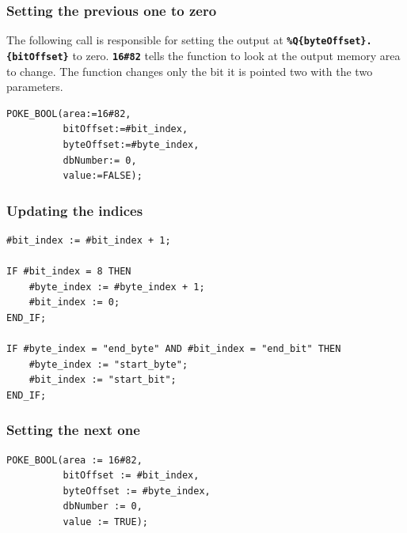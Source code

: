 \documentclass[a4paper, 12pt, titlepage]{article}
\begin{document}
            \subsubsection{Setting the previous one to zero}
                The following call is responsible for setting the output at 
                \textbf{\texttt{\%Q\{byteOffset\}.\{bitOffset\}}} to zero. 
                \texttt{\textbf{16\#82}} tells the function to look at the output memory
                area to change. The function changes only the bit it is pointed two with the
                two parameters.
\begin{lstlisting} 
POKE_BOOL(area:=16#82,
          bitOffset:=#bit_index,
          byteOffset:=#byte_index,
          dbNumber:= 0,
          value:=FALSE);
\end{lstlisting}
            \subsubsection{Updating the indices}
\begin{lstlisting}
#bit_index := #bit_index + 1;

IF #bit_index = 8 THEN
    #byte_index := #byte_index + 1;
    #bit_index := 0;
END_IF;

IF #byte_index = "end_byte" AND #bit_index = "end_bit" THEN
    #byte_index := "start_byte";
    #bit_index := "start_bit";
END_IF;
\end{lstlisting}
            \subsubsection{Setting the next one}
\begin{lstlisting}
POKE_BOOL(area := 16#82,
          bitOffset := #bit_index,
          byteOffset := #byte_index,
          dbNumber := 0,
          value := TRUE);
\end{lstlisting}
\end{document}
